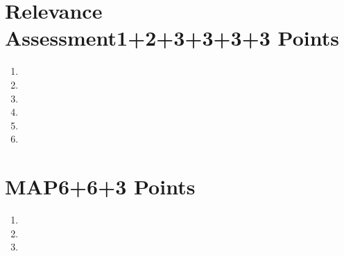\documentclass[10pt,a4paper]{article}
\begin{document}
\section{\hfill Relevance Assessment\hfill 1+2+3+3+3+3 Points}
\begin{enumerate}
    \item 
    \item 
    \item 
    \item 
    \item 
    \item 
\end{enumerate}


\section{\hfill MAP\hfill 6+6+3 Points}
\begin{enumerate}
    \item 
    \item 
    \item 
\end{enumerate}
\end{document}
